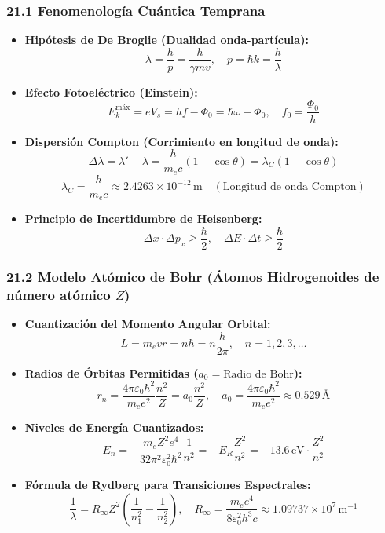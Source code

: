 \documentclass[11pt,a4paper]{article}
\begin{document}
\subsubsection*{21.1 Fenomenología Cuántica Temprana}

\begin{itemize}
  \item \textbf{Hipótesis de De Broglie (Dualidad onda-partícula):}
  \[
    \lambda = \frac{h}{p} = \frac{h}{\gamma m v}, \quad p = \hbar k = \frac{h}{\lambda}
  \]
  \item \textbf{Efecto Fotoeléctrico (Einstein):}
  \[
    E_k^{\text{máx}} = e V_s = h f - \Phi_0 = \hbar \omega - \Phi_0, \quad f_0 = \frac{\Phi_0}{h}
  \]
  \item \textbf{Dispersión Compton (Corrimiento en longitud de onda):}
  \[
    \Delta\lambda = \lambda' - \lambda = \frac{h}{m_e c}(1 - \cos\theta) = \lambda_C (1 - \cos\theta)
  \]
  \[
    \lambda_C = \frac{h}{m_e c} \approx 2.4263 \times 10^{-12} \, \text{m} \quad (\text{Longitud de onda Compton})
  \]
  \item \textbf{Principio de Incertidumbre de Heisenberg:}
  \[
    \Delta x \cdot \Delta p_x \ge \frac{\hbar}{2}, \quad \Delta E \cdot \Delta t \ge \frac{\hbar}{2}
  \]
\end{itemize}

\subsubsection*{21.2 Modelo Atómico de Bohr (Átomos Hidrogenoides de número atómico $Z$)}

\begin{itemize}
  \item \textbf{Cuantización del Momento Angular Orbital:}
  \[
    L = m_e v r = n \hbar = n \frac{h}{2\pi}, \quad n = 1, 2, 3, \dots
  \]
  \item \textbf{Radios de Órbitas Permitidas ($a_0 = \text{Radio de Bohr}$):}
  \[
    r_n = \frac{4\pi\varepsilon_0 \hbar^2}{m_e e^2} \frac{n^2}{Z} = a_0 \frac{n^2}{Z}, \quad a_0 = \frac{4\pi\varepsilon_0 \hbar^2}{m_e e^2} \approx 0.529 \, \text{Å}
  \]
  \item \textbf{Niveles de Energía Cuantizados:}
  \[
    E_n = -\frac{m_e Z^2 e^4}{32 \pi^2 \varepsilon_0^2 \hbar^2} \frac{1}{n^2} = -E_R \frac{Z^2}{n^2} = -13.6 \, \text{eV} \cdot \frac{Z^2}{n^2}
  \]
  \item \textbf{Fórmula de Rydberg para Transiciones Espectrales:}
  \[
    \frac{1}{\lambda} = R_\infty Z^2 \left( \frac{1}{n_1^2} - \frac{1}{n_2^2} \right), \quad R_\infty = \frac{m_e e^4}{8 \varepsilon_0^2 h^3 c} \approx 1.09737 \times 10^7 \, \text{m}^{-1}
  \]
\end{itemize}
\end{document}
